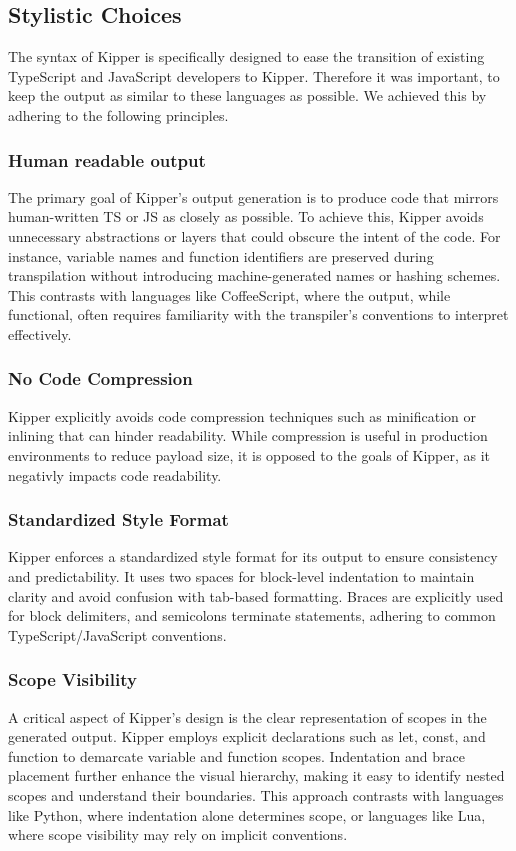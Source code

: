 \subsection{Stylistic Choices}
The syntax of Kipper is specifically designed to ease the transition of existing TypeScript and JavaScript developers to Kipper. Therefore it was important, to keep the output as similar to these languages as possible. We achieved this by adhering to the following principles.

\subsubsection{Human readable output}
The primary goal of Kipper's output generation is to produce code that mirrors human-written TS or JS as closely as possible. To achieve this, Kipper avoids unnecessary abstractions or layers that could obscure the intent of the code. For instance, variable names and function identifiers are preserved during transpilation without introducing machine-generated names or hashing schemes. This contrasts with languages like CoffeeScript, where the output, while functional, often requires familiarity with the transpiler's conventions to interpret effectively.

\subsubsection{No Code Compression}
Kipper explicitly avoids code compression techniques such as minification or inlining that can hinder readability. While compression is useful in production environments to reduce payload size, it is opposed to the goals of Kipper, as it negativly impacts code readability.

\subsubsection{Standardized Style Format}
Kipper enforces a standardized style format for its output to ensure consistency and predictability. It uses two spaces for block-level indentation to maintain clarity and avoid confusion with tab-based formatting. Braces are explicitly used for block delimiters, and semicolons terminate statements, adhering to common TypeScript/JavaScript conventions.

\subsubsection{Scope Visibility}
A critical aspect of Kipper's design is the clear representation of scopes in the generated output. Kipper employs explicit declarations such as let, const, and function to demarcate variable and function scopes. Indentation and brace placement further enhance the visual hierarchy, making it easy to identify nested scopes and understand their boundaries. This approach contrasts with languages like Python, where indentation alone determines scope, or languages like Lua, where scope visibility may rely on implicit conventions.

